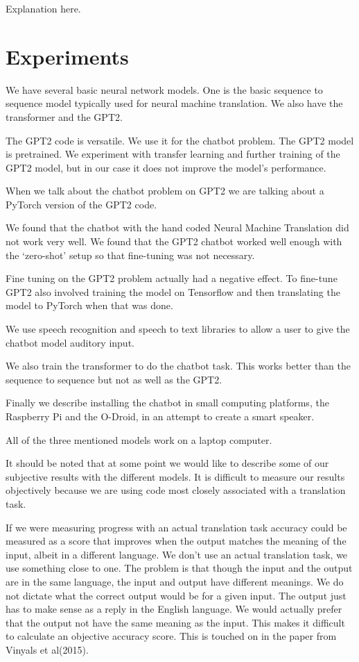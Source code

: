 Explanation here.

\section{Experiments}

We have several basic neural network models. One is the basic sequence
to sequence model typically used for neural machine translation. We also have the transformer and
the GPT2.

The GPT2 code is versatile. We use it for the chatbot problem. The GPT2 model
is pretrained. We experiment with transfer learning and further training of the GPT2 model, but
in our case it does not improve the model's performance. 

When we talk about the chatbot problem on GPT2 we are talking about a PyTorch version of the 
GPT2 code. 

We found that the chatbot with the hand coded Neural Machine Translation did not work 
very well. We found that the GPT2 chatbot worked well enough with the `zero-shot' setup so that
fine-tuning was not necessary. 

Fine tuning on the GPT2 problem actually had a negative effect. To fine-tune GPT2 also involved
training the model on Tensorflow and then translating the model to PyTorch when that was done. 

We use speech recognition and speech to text libraries to allow a user to give the chatbot model 
auditory input.

We also train the transformer to do the chatbot task. This works better than the sequence to 
sequence but not as well as the GPT2.

Finally we describe installing the chatbot in small computing platforms, the Raspberry Pi and the O-Droid, in an attempt to create a smart speaker.

All of the three mentioned models work on a laptop computer.

It should be noted that at some point we would like to describe some of our subjective
results with the different models. It is difficult to measure our results objectively because we
are using code most closely associated with a translation task. 

If we were measuring progress with an actual translation task accuracy could be measured as a score that improves when the output matches the meaning of the input, albeit in a different language. We don't use an actual translation
task, we use something close to one. The problem is that though the input 
and the output are in the same language, the input and output have different meanings. We
do not dictate what the correct output would be for a given input. The output just has to make sense as a reply in the English language. We would actually prefer that the output not have the
same meaning as the input. This makes it difficult to calculate an objective accuracy score. This
is touched on in the paper from Vinyals et al(2015)\cite{DBLP:journals/corr/VinyalsL15}.

